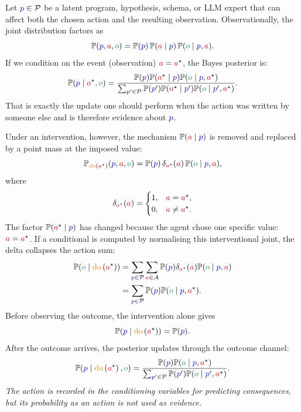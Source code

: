 \documentclass[11pt]{article}
\newcommand{\ActionSet}{\mathcal{A}}
\newcommand{\ProgramSet}{\mathcal{P}}
\newcommand{\action}{\ensuremath{\textcolor{red}{a}}}
\newcommand{\obs}{\ensuremath{\textcolor{ForestGreen}{o}}}
\newcommand{\program}{\ensuremath{\textcolor{blue}{p}}}
\newcommand{\prob}{\ensuremath{\mathbb{P}}}
\newcommand{\doop}{\operatorname{\textcolor{orange}{do}}}
\newcommand{\intervene}[1]{\ensuremath{\doop \left(#1\right)}}
\begin{document}
Let $\program\in\ProgramSet$ be a latent program, hypothesis, schema, or LLM expert
that can affect both the chosen action and the resulting observation.
Observationally, the joint distribution factors as
\[
  \prob(\program,\action,\obs)
  =
  \prob(\program)\,\prob(\action\mid \program)\,\prob(\obs\mid \program,\action).
\]
If we condition on the event (observation) $\action=\action^\star$, the Bayes posterior is:
\[
  \prob(\program\mid \action^\star, \obs)
  =
  \frac{\prob(\program)\prob(\action^\star\mid \program)\prob(\obs\mid \program,\action^\star)}
       {\sum_{\program'\in\ProgramSet}\prob(\program')\prob(\action^\star\mid \program')\prob(\obs\mid \program',\action^\star)}.
\]
That is exactly the update one should perform when the action was written by
someone else and is therefore evidence about $\program$.

Under an intervention, however, the mechanism $\prob(\action\mid \program)$ is removed and
replaced by a point mass at the imposed value:
\[
  \prob_{\intervene{\action^\star}}(\program,\action,\obs)
  =
  \prob(\program)\,\delta_{\action^\star}(\action)\,\prob(\obs\mid \program,\action),
\]
where
\[
  \delta_{\action^\star}(\action)
  =
  \begin{cases}
  1, & \action=\action^\star,\\
  0, & \action\neq \action^\star.
  \end{cases}
\]
The factor $\prob(\action^\star\mid \program)$ has changed because the agent chose one specific value: $\action=\action^\star$. If a conditional is computed
by normalising this interventional joint, the delta collapses the action sum:
\[
\begin{aligned}
  \prob(\obs\mid \intervene{\action^\star})
  &= \sum_{\program\in\ProgramSet}\sum_{\action\in\ActionSet}
        \prob(\program)\delta_{\action^\star}(\action)\prob(\obs\mid \program,\action)
       \\
  &=
  \sum_{\program\in\ProgramSet} \prob(\program)\prob(\obs\mid \program,\action^\star).
\end{aligned}
\]
Before observing the outcome, the intervention alone gives
\[
  \prob(\program\mid \intervene{\action^\star})=\prob(\program).
\]
After the outcome arrives, the posterior updates through the outcome channel:
\[
  \prob(\program\mid \intervene{\action^\star},\obs)
  =
  \frac{\prob(\program)\prob(\obs\mid \program,\action^\star)}
       {\sum_{\program'\in\ProgramSet}\prob(\program')\prob(\obs\mid \program',\action^\star)}.
\]
\emph{The
action is recorded in the conditioning variables for predicting consequences,
but its probability as an action is not used as evidence.}
\end{document}
